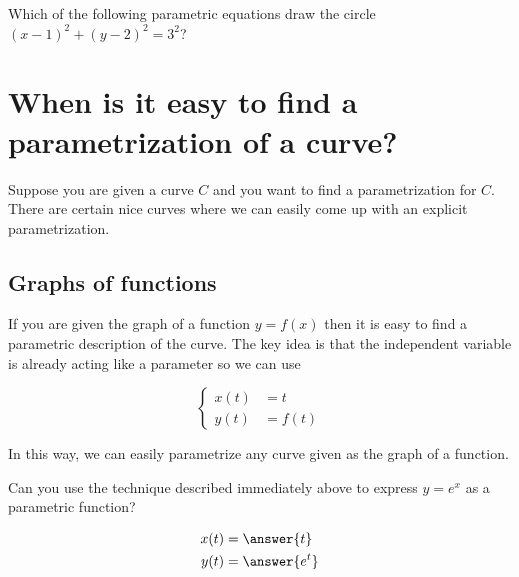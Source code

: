 \documentclass{ximera}
\begin{document}
\begin{question}
  Which of the following parametric equations draw the circle $(x-1)^2
  + (y-2)^2 = 3^2$?
  \begin{selectAll}
  \end{selectAll}
\end{question}











\section{When is it easy to find a parametrization of a curve?}

Suppose you are given a curve $C$ and you want to find a parametrization for $C$. There are certain nice curves where we can easily come up with an explicit parametrization.

\subsection{Graphs of functions}

If you are given the graph of a function $y=f(x)$ then it is easy to find a parametric description of the curve. The key idea is that the independent variable is already acting like a parameter so we can use


\[
\begin{cases}
x(t)&=t \\
y(t)&=f(t)
\end{cases}
\]

In this way, we can easily parametrize any curve given as the graph of a function.

\begin{question}
  Can you use the technique described immediately above to express $y
  = e^x$ as a parametric function?
  \begin{prompt}
    \begin{align*}
      x(t) &= \answer{t}\\
      y(t) &= \answer{e^t}
    \end{align*}
  \end{prompt}
\end{question}
\end{document}
